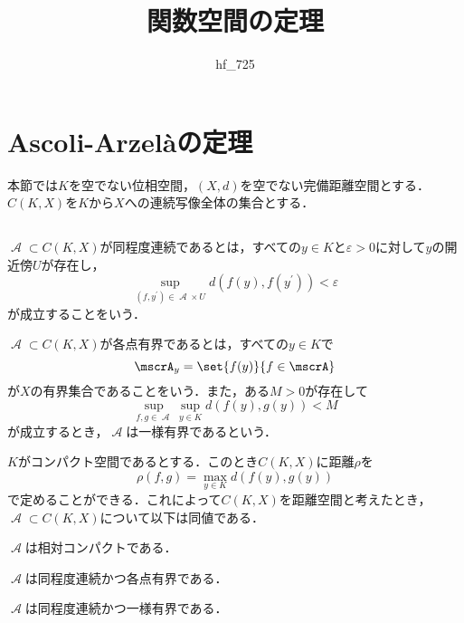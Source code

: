 \documentclass[uplatex]{jsarticle}
\title{関数空間の定理}
\author{hf\_725}
\date{}
\begin{document}
\maketitle
\begin{abstract}

\end{abstract}

\section{Ascoli-Arzel\`{a}の定理}

本節では$K$を空でない位相空間，$(X,d)$を空でない完備距離空間とする．$C(K,X)$を$K$から$X$への連続写像全体の集合とする．

\subsection{}

\begin{definition}
    $\mscrA\subset C(K,X)$が同程度連続であるとは，すべての$y\in K$と$\varepsilon > 0$に対して$y$の開近傍$U$が存在し，
    \[ \sup_{(f,y^\prime)\in \mscrA\times U} d(f(y),f(y^\prime)) < \varepsilon \]
    が成立することをいう．
\end{definition}

\begin{definition}
    $\mscrA\subset C(K,X)$が各点有界であるとは，すべての$y\in K$で
    \[ \mscrA_y = \set{f(y)}{f\in \mscrA} \]
    が$X$の有界集合であることをいう．また，ある$M > 0$が存在して
    \[ \sup_{f,g\in \mscrA} \sup_{y\in K} d(f(y),g(y)) < M \]
    が成立するとき，$\mscrA$は一様有界であるという．
\end{definition}

\begin{theorem}\label{AA1}
    $K$がコンパクト空間であるとする．このとき$C(K,X)$に距離$\rho$を
    \[ \rho(f,g) = \max_{y\in K} d(f(y),g(y)) \]
    で定めることができる．これによって$C(K,X)$を距離空間と考えたとき，$\mscrA\subset C(K,X)$について以下は同値である．
    \begin{enumarabicp}
        \item $\mscrA$は相対コンパクトである．
        \item $\mscrA$は同程度連続かつ各点有界である．
        \item $\mscrA$は同程度連続かつ一様有界である．
    \end{enumarabicp}
\end{theorem}
\end{document}
